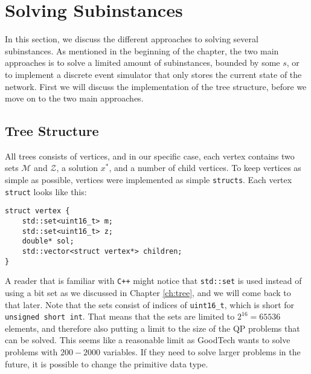 \section{Solving Subinstances}
In this section, we discuss the different approaches to solving several
subinstances. As mentioned in the beginning of the chapter, the two
main approaches is to solve a limited amount of subinstances, bounded
by some $s$, or to implement a discrete event simulator that only stores
the current state of the network. First we will discuss the implementation
of the tree structure, before we move on to the two main approaches.

\subsection{Tree Structure}
All trees consists of vertices, and in our specific case, each vertex contains
two sets $\mathcal{M}$ and $\mathcal{Z}$, a solution $x^*$, and a number of
child vertices. To keep vertices as simple as possible, vertices were
implemented as simple \texttt{structs}. Each vertex \texttt{struct} looks like
this:
\begin{verbatim}
struct vertex {
    std::set<uint16_t> m;
    std::set<uint16_t> z;
    double* sol;
    std::vector<struct vertex*> children;
}
\end{verbatim}
A reader that is familiar with \texttt{C++} might notice that
\texttt{std::set} is used instead of using a bit set as we discussed
in Chapter \ref{ch:tree}, and we will come back to that later. Note that
the sets consist of indices of \texttt{uint16\_t}, which is short for
\texttt{unsigned short int}. That means that the sets are limited to
$2^{16} = 65536$ elements, and therefore also putting a limit to the size
of the QP problems that can be solved. This seems like a reasonable limit
as GoodTech wants to solve problems with $200 - 2000$ variables.
If they need to solve larger problems in the future, it is possible to change
the primitive data type.
